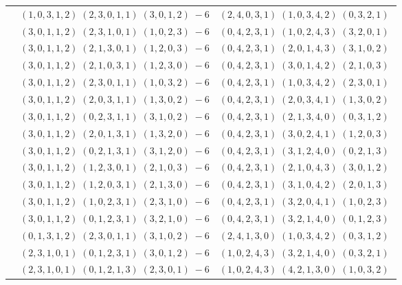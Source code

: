 \documentclass[11pt]{article}
\begin{document}
\begin{longtable}[l]{|c|c|c|}
 \cline{2-3} 
 & $(1 ,0 ,3 ,1 ,2) \;(2 ,3 ,0 ,1 ,1) \;(3 ,0 ,1 ,2) \;-6$ & $(2 ,4 ,0 ,3 ,1) \;(1 ,0 ,3 ,4 ,2) \;(0 ,3 ,2 ,1) \;$\\ 
 \cline{2-3} 
 & $(3 ,0 ,1 ,1 ,2) \;(2 ,3 ,1 ,0 ,1) \;(1 ,0 ,2 ,3) \;-6$ & $(0 ,4 ,2 ,3 ,1) \;(1 ,0 ,2 ,4 ,3) \;(3 ,2 ,0 ,1) \;$\\ 
 \cline{2-3} 
 & $(3 ,0 ,1 ,1 ,2) \;(2 ,1 ,3 ,0 ,1) \;(1 ,2 ,0 ,3) \;-6$ & $(0 ,4 ,2 ,3 ,1) \;(2 ,0 ,1 ,4 ,3) \;(3 ,1 ,0 ,2) \;$\\ 
 \cline{2-3} 
 & $(3 ,0 ,1 ,1 ,2) \;(2 ,1 ,0 ,3 ,1) \;(1 ,2 ,3 ,0) \;-6$ & $(0 ,4 ,2 ,3 ,1) \;(3 ,0 ,1 ,4 ,2) \;(2 ,1 ,0 ,3) \;$\\ 
 \cline{2-3} 
 & $(3 ,0 ,1 ,1 ,2) \;(2 ,3 ,0 ,1 ,1) \;(1 ,0 ,3 ,2) \;-6$ & $(0 ,4 ,2 ,3 ,1) \;(1 ,0 ,3 ,4 ,2) \;(2 ,3 ,0 ,1) \;$\\ 
 \cline{2-3} 
 & $(3 ,0 ,1 ,1 ,2) \;(2 ,0 ,3 ,1 ,1) \;(1 ,3 ,0 ,2) \;-6$ & $(0 ,4 ,2 ,3 ,1) \;(2 ,0 ,3 ,4 ,1) \;(1 ,3 ,0 ,2) \;$\\ 
 \cline{2-3} 
 & $(3 ,0 ,1 ,1 ,2) \;(0 ,2 ,3 ,1 ,1) \;(3 ,1 ,0 ,2) \;-6$ & $(0 ,4 ,2 ,3 ,1) \;(2 ,1 ,3 ,4 ,0) \;(0 ,3 ,1 ,2) \;$\\ 
 \cline{2-3} 
 & $(3 ,0 ,1 ,1 ,2) \;(2 ,0 ,1 ,3 ,1) \;(1 ,3 ,2 ,0) \;-6$ & $(0 ,4 ,2 ,3 ,1) \;(3 ,0 ,2 ,4 ,1) \;(1 ,2 ,0 ,3) \;$\\ 
 \cline{2-3} 
 & $(3 ,0 ,1 ,1 ,2) \;(0 ,2 ,1 ,3 ,1) \;(3 ,1 ,2 ,0) \;-6$ & $(0 ,4 ,2 ,3 ,1) \;(3 ,1 ,2 ,4 ,0) \;(0 ,2 ,1 ,3) \;$\\ 
 \cline{2-3} 
 & $(3 ,0 ,1 ,1 ,2) \;(1 ,2 ,3 ,0 ,1) \;(2 ,1 ,0 ,3) \;-6$ & $(0 ,4 ,2 ,3 ,1) \;(2 ,1 ,0 ,4 ,3) \;(3 ,0 ,1 ,2) \;$\\ 
 \cline{2-3} 
 & $(3 ,0 ,1 ,1 ,2) \;(1 ,2 ,0 ,3 ,1) \;(2 ,1 ,3 ,0) \;-6$ & $(0 ,4 ,2 ,3 ,1) \;(3 ,1 ,0 ,4 ,2) \;(2 ,0 ,1 ,3) \;$\\ 
 \cline{2-3} 
 & $(3 ,0 ,1 ,1 ,2) \;(1 ,0 ,2 ,3 ,1) \;(2 ,3 ,1 ,0) \;-6$ & $(0 ,4 ,2 ,3 ,1) \;(3 ,2 ,0 ,4 ,1) \;(1 ,0 ,2 ,3) \;$\\ 
 \cline{2-3} 
 & $(3 ,0 ,1 ,1 ,2) \;(0 ,1 ,2 ,3 ,1) \;(3 ,2 ,1 ,0) \;-6$ & $(0 ,4 ,2 ,3 ,1) \;(3 ,2 ,1 ,4 ,0) \;(0 ,1 ,2 ,3) \;$\\ 
 \cline{2-3} 
 & $(0 ,1 ,3 ,1 ,2) \;(2 ,3 ,0 ,1 ,1) \;(3 ,1 ,0 ,2) \;-6$ & $(2 ,4 ,1 ,3 ,0) \;(1 ,0 ,3 ,4 ,2) \;(0 ,3 ,1 ,2) \;$\\ 
 \cline{2-3} 
 & $(2 ,3 ,1 ,0 ,1) \;(0 ,1 ,2 ,3 ,1) \;(3 ,0 ,1 ,2) \;-6$ & $(1 ,0 ,2 ,4 ,3) \;(3 ,2 ,1 ,4 ,0) \;(0 ,3 ,2 ,1) \;$\\ 
 \cline{2-3} 
 & $(2 ,3 ,1 ,0 ,1) \;(0 ,1 ,2 ,1 ,3) \;(2 ,3 ,0 ,1) \;-6$ & $(1 ,0 ,2 ,4 ,3) \;(4 ,2 ,1 ,3 ,0) \;(1 ,0 ,3 ,2) \;$\\ 

\end{longtable}
\end{document}
